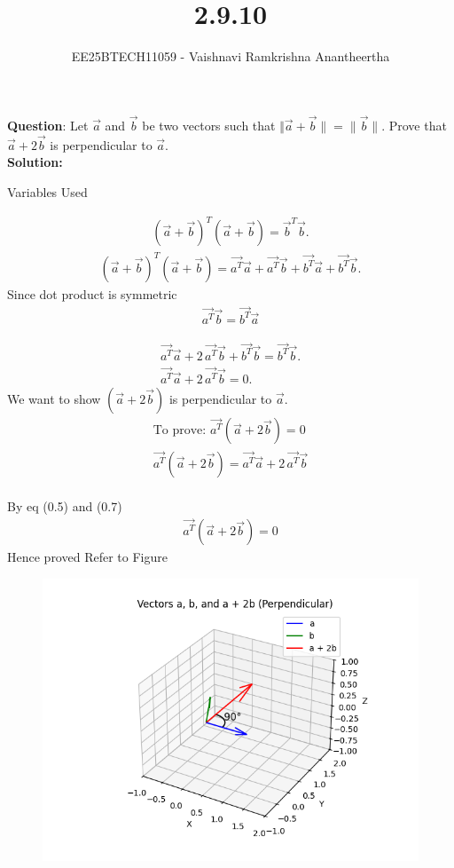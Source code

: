 \documentclass[journal]{IEEEtran}
\title{2.9.10}
\author{EE25BTECH11059 - Vaishnavi Ramkrishna Anantheertha}
\begin{document}
\maketitle

\renewcommand{\thefigure}{\theenumi}
\renewcommand{\thetable}{\theenumi}


\textbf{Question}:
Let $\vec a$ and $\vec b$ be two vectors such that
$
\Vert \vec {a} + \vec {b}\rVert = \lVert \vec {b}\rVert.
$
Prove that $\vec a + 2\vec b$ is perpendicular to $\vec a$.
\\
\textbf{Solution: }\\
\begin{table}[H]    
  \centering
  
  \caption{Variables Used}
  \label{tab:2.9.10}
\end{table}

\begin{align}
(\vec {a} + \vec {b})^T(\vec {a} + \vec {b}) = \vec {b}^T \vec {b}.
\end{align}
\begin{align}
(\vec {a} + \vec {b})^T(\vec {a} + \vec {b})
= \vec {a^T} \vec {a} + \vec {a^T} \vec {b} + \vec {b^T} \vec {a} + \vec {b^T} \vec {b}.
\end{align}
Since dot product is symmetric\\
\begin{align}
\vec {a^T} \vec {b} = \vec {b^T} \vec {a}
\end{align}

\begin{align}
\vec {a^T} \vec {a} + 2\,\vec {a^T} \vec {b} + \vec {b^T} \vec {b} = \vec {b^T} \vec {b}.\\
\vec {a^T} \vec {a} + 2\,\vec {a^T} \vec {b} = 0.
\end{align}
We want to show $(\vec {a} + 2\vec {b})$ is perpendicular to $\vec {a}$.\\
\begin{align}
 \text{To prove: }\vec {a^T}(\vec {a} + 2\vec {b}) = 0\\
\vec {a^T}(\vec {a} + 2\vec {b}) = \vec {a^T} \vec {a} + 2\,\vec {a^T} \vec {b}
\end{align}
\\
By eq (0.5) and (0.7)
\begin{align}
\vec {a^T}(\vec {a} + 2\vec {b}) = 0
\end{align}
Hence proved 
\newpage
Refer to Figure

\begin{figure}[H]
\begin{center}
\includegraphics[width=0.6\columnwidth]{figs/graph4.png}
\end{center}
\caption{}
\label{fig:Fig}
\end{figure}
\end{document}
